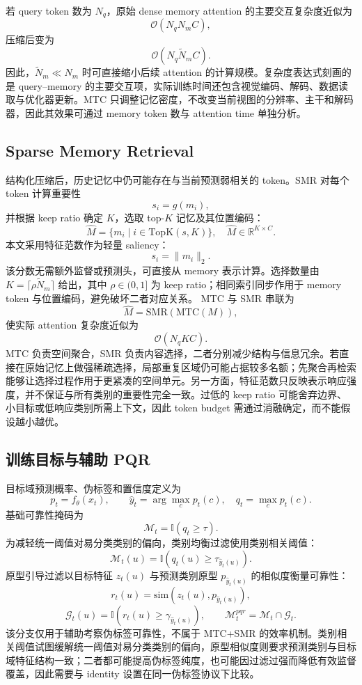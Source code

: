 若 query token 数为 $N_q$，原始 dense memory attention 的主要交互复杂度近似为
\[
\mathcal{O}(N_qN_mC),
\]
压缩后变为
\[
\mathcal{O}(N_q\tilde{N}_mC).
\]
因此，$\tilde{N}_m\ll N_m$ 时可直接缩小后续 attention 的计算规模。复杂度表达式刻画的是 query--memory 的主要交互项，实际训练时间还包含视觉编码、解码、数据读取与优化器更新。MTC 只调整记忆密度，不改变当前视图的分辨率、主干和解码器，因此其效果可通过 memory token 数与 attention time 单独分析。

\subsection{Sparse Memory Retrieval}
结构化压缩后，历史记忆中仍可能存在与当前预测弱相关的 token。SMR 对每个 token 计算重要性
\[
s_i=g(m_i),
\]
并根据 keep ratio 确定 $K$，选取 top-$K$ 记忆及其位置编码：
\[
\hat{M}=\{m_i\mid i\in\mathrm{TopK}(s,K)\},\quad
\hat{M}\in\mathbb{R}^{K\times C}.
\]
本文采用特征范数作为轻量 saliency：
\[
s_i=\lVert m_i\rVert_2.
\]
该分数无需额外监督或预测头，可直接从 memory 表示计算。选择数量由 $K=\lceil\rho\tilde{N}_m\rceil$ 给出，其中 $\rho\in(0,1]$ 为 keep ratio；相同索引同步作用于 memory token 与位置编码，避免破坏二者对应关系。
MTC 与 SMR 串联为
\[
\hat{M}=\mathrm{SMR}(\mathrm{MTC}(M)),
\]
使实际 attention 复杂度近似为
\[
\mathcal{O}(N_qKC).
\]
MTC 负责空间聚合，SMR 负责内容选择，二者分别减少结构与信息冗余。若直接在原始记忆上做强稀疏选择，局部重复区域仍可能占据较多名额；先聚合再检索能够让选择过程作用于更紧凑的空间单元。另一方面，特征范数只反映表示响应强度，并不保证与所有类别的重要性完全一致。过低的 keep ratio 可能舍弃边界、小目标或低响应类别所需上下文，因此 token budget 需通过消融确定，而不能假设越小越优。

\subsection{训练目标与辅助 PQR}
目标域预测概率、伪标签和置信度定义为
\[
p_t=f_{\theta}(x_t),\qquad
\hat{y}_t=\arg\max_c p_t(c),\quad q_t=\max_c p_t(c).
\]
基础可靠性掩码为~\cite{zou2018cbst,hoyer2023mic,zheng2025sfuda360pp}
\[
\mathcal{M}_t=\mathbb{I}(q_t\geq\tau).
\]
为减轻统一阈值对易分类类别的偏向，类别均衡过滤使用类别相关阈值：
\[
\mathcal{M}_t(u)=\mathbb{I}\!\left(q_t(u)\geq\tau_{\hat{y}_t(u)}\right).
\]
原型引导过滤以目标特征 $z_t(u)$ 与预测类别原型 $p_{\hat{y}_t(u)}$ 的相似度衡量可靠性：
\[
r_t(u)=\mathrm{sim}\!\left(z_t(u),p_{\hat{y}_t(u)}\right),
\]
\[
\mathcal{G}_t(u)=\mathbb{I}\!\left(r_t(u)\geq\gamma_{\hat{y}_t(u)}\right),\qquad
\mathcal{M}^{pqr}_t=\mathcal{M}_t\cap\mathcal{G}_t.
\]
该分支仅用于辅助考察伪标签可靠性，不属于 MTC+SMR 的效率机制。类别相关阈值试图缓解统一阈值对易分类类别的偏向，原型相似度则要求预测类别与目标域特征结构一致；二者都可能提高伪标签纯度，也可能因过滤过强而降低有效监督覆盖，因此需要与 identity 设置在同一伪标签协议下比较。

